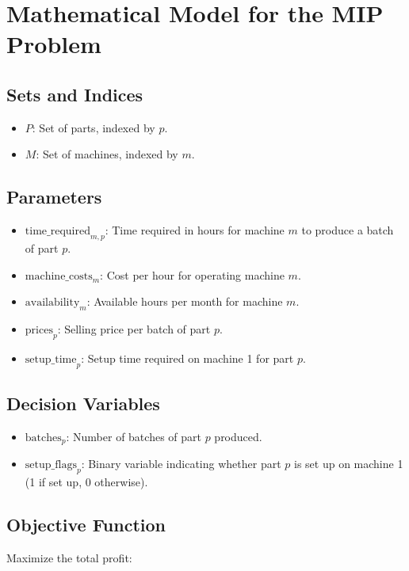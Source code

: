 \documentclass{article}
\begin{document}
\section*{Mathematical Model for the MIP Problem}

\subsection*{Sets and Indices}
\begin{itemize}
    \item \( P \): Set of parts, indexed by \( p \).
    \item \( M \): Set of machines, indexed by \( m \).
\end{itemize}

\subsection*{Parameters}
\begin{itemize}
    \item \( \text{time\_required}_{m,p} \): Time required in hours for machine \( m \) to produce a batch of part \( p \).
    \item \( \text{machine\_costs}_m \): Cost per hour for operating machine \( m \).
    \item \( \text{availability}_m \): Available hours per month for machine \( m \).
    \item \( \text{prices}_p \): Selling price per batch of part \( p \).
    \item \( \text{setup\_time}_p \): Setup time required on machine 1 for part \( p \).
\end{itemize}

\subsection*{Decision Variables}
\begin{itemize}
    \item \( \text{batches}_p \): Number of batches of part \( p \) produced.
    \item \( \text{setup\_flags}_p \): Binary variable indicating whether part \( p \) is set up on machine 1 (1 if set up, 0 otherwise).
\end{itemize}

\subsection*{Objective Function}
Maximize the total profit:
\end{document}
